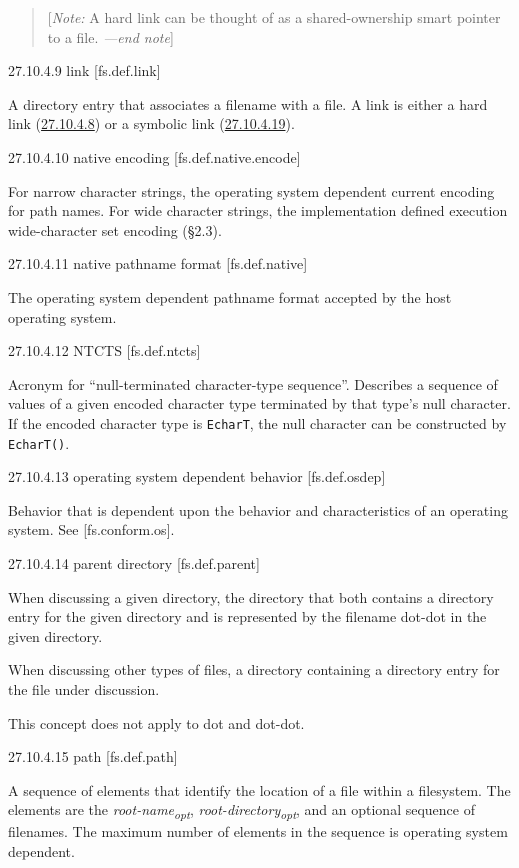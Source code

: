 \begin{quote}
{[}\emph{Note:} A hard link can be thought of as a shared-ownership
smart pointer to a file. \emph{---end note}{]} \emph{}
\end{quote}

27.10.4.9 link {[}fs.def.link{]}

A directory entry that associates a filename with a file. A link is
either a hard link (\hyperref[fs.def.hardlink]{27.10.4.8}) or a symbolic
link (\hyperref[fs.def.symlink]{27.10.4.19}).

27.10.4.10 native encoding {[}fs.def.native.encode{]}

For narrow character strings, the operating system dependent current
encoding for path names. For wide character strings, the implementation
defined execution wide-character set encoding (§2.3).

27.10.4.11 native pathname format {[}fs.def.native{]}

The operating system dependent pathname format accepted by the host
operating system.

27.10.4.12 NTCTS {[}fs.def.ntcts{]}

Acronym for ``null-terminated character-type sequence''. Describes a
sequence of values of a given encoded character type terminated by that
type's null character. If the encoded character type is \texttt{EcharT},
the null character can be constructed by \texttt{EcharT()}.

27.10.4.13 operating system dependent behavior {[}fs.def.osdep{]}

Behavior that is dependent upon the behavior and characteristics of an
operating system. See {[}fs.conform.os{]}.

27.10.4.14 parent directory {[}fs.def.parent{]}

When discussing a given directory, the directory that both contains a
directory entry for the given directory and is represented by the
filename dot-dot in the given directory.

When discussing other types of files, a directory containing a directory
entry for the file under discussion.

This concept does not apply to dot and dot-dot.

27.10.4.15 path {[}fs.def.path{]}

A sequence of elements that identify the location of a file within a
filesystem. The elements are the \emph{root-name\textsubscript{opt}},
\emph{root-directory\textsubscript{opt}}, and an optional sequence of
filenames. The maximum number of elements in the sequence is operating
system dependent.

